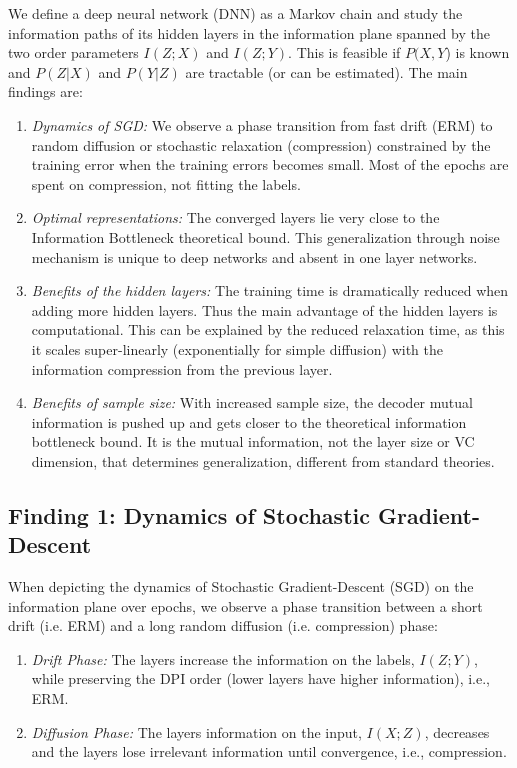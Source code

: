 \documentclass[11pt]{article}
\begin{document}
We define a deep neural network (DNN) as a Markov chain and study the information paths of its hidden layers in the information plane spanned by the two order parameters $I(Z;X)$ and $I(Z;Y)$. This is feasible if $P(X,Y$) is known and $P(Z \vert X)$ and $P(Y\vert Z)$ are tractable (or can be estimated). The main findings are:
\begin{enumerate}
	\item \emph{Dynamics of SGD:} We observe a phase transition from fast drift (ERM) to random diffusion or stochastic relaxation (compression) constrained by the training error when the training errors becomes small. Most of the epochs are spent on compression, not fitting the labels.
	\item \emph{Optimal representations:} The converged layers lie very close to the Information Bottleneck theoretical bound. This generalization through noise mechanism is unique to deep networks and absent in one layer networks.
	\item \emph{Benefits of the hidden layers:} The training time is dramatically reduced when adding more hidden layers. Thus the main advantage of the hidden layers is computational. This can be explained by the reduced relaxation time, as this it scales super-linearly (exponentially for simple diffusion) with the information compression from the previous layer.
	\item \emph{Benefits of sample size:} With increased sample size, the decoder mutual information is pushed up and gets closer to the theoretical information bottleneck bound. It is the mutual information, not the layer size or VC dimension, that determines generalization, different from standard theories.
\end{enumerate}

\subsection*{Finding 1: Dynamics of Stochastic Gradient-Descent}

When depicting the dynamics of Stochastic Gradient-Descent (SGD) on the information plane over epochs, we observe a phase transition between a short drift (i.e. ERM) and a long random diffusion (i.e. compression) phase:

\begin{enumerate}
\item \emph{Drift Phase:} The layers increase the information on the labels, $I(Z;Y)$, while preserving the DPI order (lower layers have higher information), i.e., ERM.
\item \emph{Diffusion Phase:} The layers information on the input, $I(X;Z)$, decreases and the layers lose irrelevant information until convergence, i.e., compression.
\end{enumerate}
\end{document}
